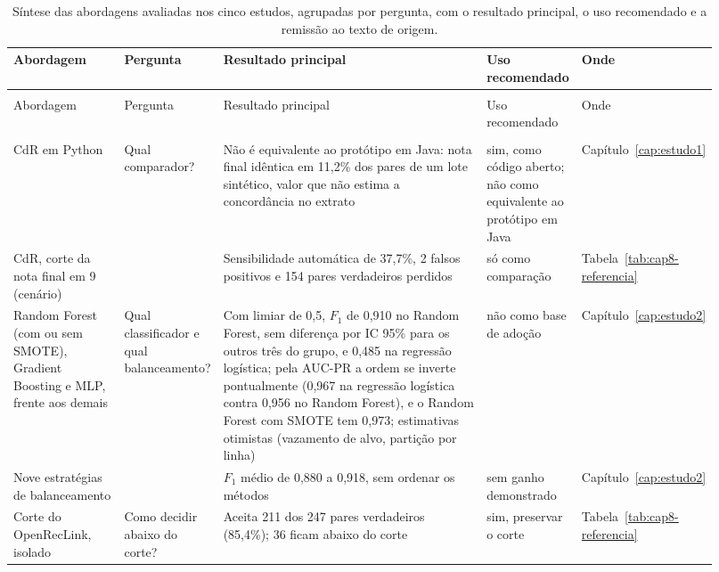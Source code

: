 \begingroup
\footnotesize
\setlength{\tabcolsep}{3pt}
\setlength{\LTcapwidth}{\linewidth}
\begin{longtable}{>{\raggedright\arraybackslash}p{0.16\linewidth}>{\raggedright\arraybackslash}p{0.12\linewidth}>{\raggedright\arraybackslash}p{0.40\linewidth}>{\raggedright\arraybackslash}p{0.13\linewidth}>{\raggedright\arraybackslash}p{0.11\linewidth}}
\caption[Síntese das abordagens avaliadas]{Síntese das abordagens avaliadas nos cinco estudos, agrupadas por pergunta, com o resultado principal, o uso recomendado e a remissão ao texto de origem.}\label{tab:concl-sintese}\\
\toprule
Abordagem & Pergunta & Resultado principal & Uso recomendado & Onde \\
\endfirsthead
\multicolumn{5}{l}{\textit{(continuação)}} \\
\toprule
Abordagem & Pergunta & Resultado principal & Uso recomendado & Onde \\
\endhead
\midrule
\multicolumn{5}{r}{\textit{(continua)}} \\
\endfoot
\bottomrule
\endlastfoot
\midrule
CdR em Python & Qual comparador? & Não é equivalente ao protótipo em Java: nota final idêntica em 11,2\% dos pares de um lote sintético, valor que não estima a concordância no extrato & sim, como código aberto; não como equivalente ao protótipo em Java & Capítulo~\ref{cap:estudo1} \\
CdR, corte da nota final em 9 (cenário) &  & Sensibilidade automática de 37,7\%, 2 falsos positivos e 154 pares verdadeiros perdidos & só como comparação & Tabela~\ref{tab:cap8-referencia} \\
\midrule
Random Forest (com ou sem SMOTE), Gradient Boosting e MLP, frente aos demais & Qual classificador e qual balanceamento? & Com limiar de 0,5, $F_1$ de 0,910 no Random Forest, sem diferença por IC 95\% para os outros três do grupo, e 0,485 na regressão logística; pela AUC-PR a ordem se inverte pontualmente (0,967 na regressão logística contra 0,956 no Random Forest), e o Random Forest com SMOTE tem 0,973; estimativas otimistas (vazamento de alvo, partição por linha) & não como base de adoção & Capítulo~\ref{cap:estudo2} \\
Nove estratégias de balanceamento &  & $F_1$ médio de 0,880 a 0,918, sem ordenar os métodos & sem ganho demonstrado & Capítulo~\ref{cap:estudo2} \\
\midrule
Corte do OpenRecLink, isolado & Como decidir abaixo do corte? & Aceita 211 dos 247 pares verdadeiros (85,4\%); 36 ficam abaixo do corte & sim, preservar o corte & Tabela~\ref{tab:cap8-referencia} \\

\end{longtable}
